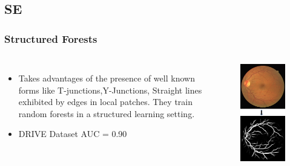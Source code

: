 \documentclass{beamer}
\begin{document}


\subsection{SE}

\begin{frame}
\frametitle{Structured Forests}
\begin{columns}[c] %

\begin{itemize}
\item Takes advantages of the presence of well known forms like  T-junctions,Y-Junctions, Straight lines exhibited by edges in local patches. They train random forests in a structured learning setting.
\item DRIVE Dataset AUC  = 0.90
\end{itemize}

\begin{figure}
\includegraphics[width=0.6\linewidth]{Images/SE.png}
\end{figure}

\end{columns}

\end{frame}
\end{document}
